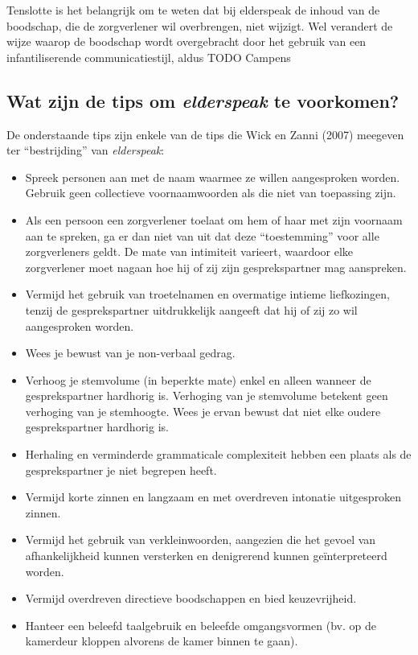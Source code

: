 Tenslotte is het belangrijk om te weten dat bij elderspeak de inhoud van de boodschap, die de zorgverlener wil overbrengen, niet wijzigt. Wel verandert de wijze waarop de boodschap wordt overgebracht door het gebruik van een infantiliserende communicatiestijl, aldus \autocite{TODO} TODO Campens

\subsection{Wat zijn de tips om \textit{elderspeak} te voorkomen?}

De onderstaande tips zijn enkele van de tips die Wick en Zanni (2007) meegeven ter “bestrijding” van \textit{elderspeak}:

\begin{itemize}
    \item Spreek personen aan met de naam waarmee ze willen aangesproken worden. Gebruik geen collectieve voornaamwoorden als die niet van toepassing zijn.
    \item Als een persoon een zorgverlener toelaat om hem of haar met zijn voornaam aan te spreken, ga er dan niet van uit dat deze “toestemming” voor alle zorgverleners geldt. De mate van intimiteit varieert, waardoor elke zorgverlener moet nagaan hoe hij of zij zijn gesprekspartner mag aanspreken.
    \item Vermijd het gebruik van troetelnamen en overmatige intieme liefkozingen, tenzij de gesprekspartner uitdrukkelijk aangeeft dat hij of zij zo wil aangesproken worden.
    \item Wees je bewust van je non-verbaal gedrag.
    \item Verhoog je stemvolume (in beperkte mate) enkel en alleen wanneer de gesprekspartner hardhorig is. Verhoging van je stemvolume betekent geen verhoging van je stemhoogte. Wees je ervan bewust dat niet elke oudere gesprekspartner hardhorig is.
    \item Herhaling en verminderde grammaticale complexiteit hebben een plaats als de gesprekspartner je niet begrepen heeft.
    \item Vermijd korte zinnen en langzaam en met overdreven intonatie uitgesproken zinnen.
    \item Vermijd het gebruik van verkleinwoorden, aangezien die het gevoel van afhankelijkheid kunnen versterken en denigrerend kunnen geïnterpreteerd worden.
    \item Vermijd overdreven directieve boodschappen en bied keuzevrijheid.
    \item Hanteer een beleefd taalgebruik en beleefde omgangsvormen (bv. op de kamerdeur kloppen alvorens de kamer binnen te gaan).
\end{itemize}
